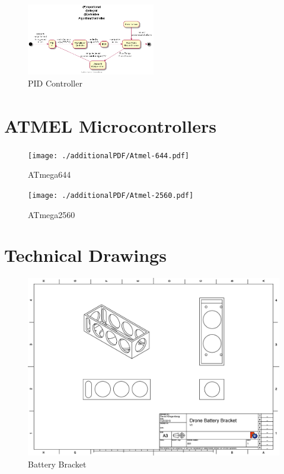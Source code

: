 \documentclass[pdftex,11pt]{article}
\begin{document}
\begin{figure}[!h]
	\centering
		\includegraphics[width=0.5\textwidth]{./plantUML/PIDloop}
	\caption{PID Controller}
	\label{fig:PIDloop}
\end{figure}

\clearpage
\section{ATMEL\textsuperscript{\textcopyright} Microcontrollers}
\label{sec:appATMEL}
\begin{figure}[!h]
	\centering
		\texttt{[image: ./additionalPDF/Atmel-644.pdf]}
	\caption{ATmega644}
	\label{fig:ATmega644}
\end{figure}

\begin{figure}[!h]
	\centering
		\texttt{[image: ./additionalPDF/Atmel-2560.pdf]}
	\caption{ATmega2560}
	\label{fig:ATmega2560}
\end{figure}

\clearpage

\section{Technical Drawings}
\label{sec:TechDraw}

\begin{figure}[!h]
	\centering
		\includegraphics[width=1\textwidth]{./graphics/BatteryBoxV2Drawing.eps}
	\caption{Battery Bracket}
	\label{fig:BattBin}
\end{figure}
\end{document}
